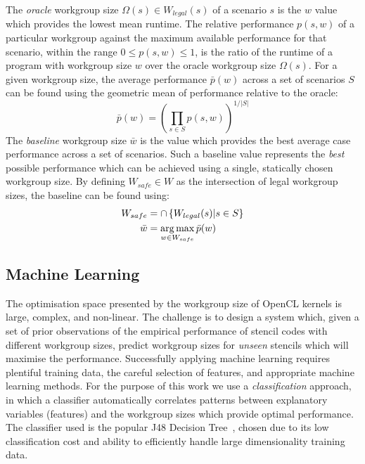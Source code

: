 \documentclass[nonatbib,preprint,9pt]{sigplanconf}
\begin{document}
The \emph{oracle} workgroup size $\Omega(s) \in W_{legal}(s)$ of a
scenario $s$ is the $w$ value which provides the lowest mean
runtime. The relative performance $p(s,w)$ of a particular workgroup
against the maximum available performance for that scenario, within
the range $0 \le p(s,w) \le 1$, is the ratio of the runtime of a
program with workgroup size $w$ over the oracle workgroup size
$\Omega(s)$. For a given workgroup size, the average performance
$\bar{p}(w)$ across a set of scenarios $S$ can be found using the
geometric mean of performance relative to the oracle:
%
\begin{equation}
  \bar{p}(w) =
  \left(
    \prod_{s \in S} p(s, w)
  \right)^{1/|S|}
\end{equation}
%
The \emph{baseline} workgroup size $\bar{w}$ is the value which
provides the best average case performance across a set of
scenarios. Such a baseline value represents the \emph{best} possible
performance which can be achieved using a single, statically chosen
workgroup size. By defining $W_{safe} \in W$ as the intersection of
legal workgroup sizes, the baseline can be found using:
%
\begin{align}
W_{safe} &= \cap \left\{ W_{legal}(s) | s \in S \right\}\\
\bar{w} &= \operatorname*{arg\,max}_{w \in W_{safe}} \bar{p}(w)
\end{align}


\subsection{Machine Learning}

The optimisation space presented by the workgroup size of OpenCL
kernels is large, complex, and non-linear. The challenge is to design
a system which, given a set of prior observations of the empirical
performance of stencil codes with different workgroup sizes, predict
workgroup sizes for \emph{unseen} stencils which will maximise the
performance. Successfully applying machine learning requires plentiful
training data, the careful selection of features, and appropriate
machine learning methods. For the purpose of this work we use a
\emph{classification} approach, in which a classifier automatically
correlates patterns between explanatory variables (features) and the
workgroup sizes which provide optimal performance. The classifier used
is the popular J48 Decision Tree~\cite{Han2011}, chosen due to its low
classification cost and ability to efficiently handle large
dimensionality training data.
\end{document}

